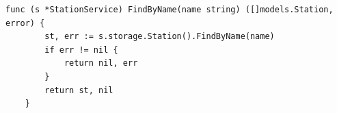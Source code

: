 \begin{lstlisting}[label=list:service_read_station_FindByName,caption=Serwis wyszukiwania stacji ładowania według nazwy,basicstyle=\tiny\ttfamily]
    func (s *StationService) FindByName(name string) ([]models.Station, error) {
        st, err := s.storage.Station().FindByName(name)
        if err != nil {
            return nil, err
        }
        return st, nil
    }
\end{lstlisting}
